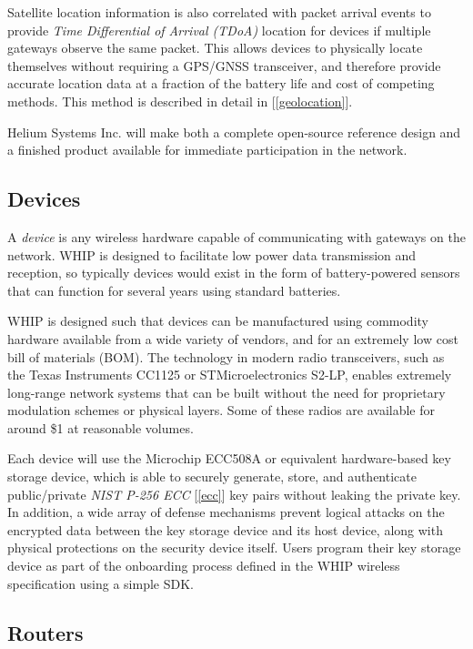 \documentclass[letterpaper,11pt]{article}
\begin{document}
Satellite location information is also correlated with packet arrival events to provide \emph{Time Differential of Arrival (TDoA)} location for devices if multiple gateways observe the same packet. This allows devices to physically locate themselves without requiring a GPS/GNSS transceiver, and therefore provide accurate location data at a fraction of the battery life and cost of competing methods. This method is described in detail in [\ref{geolocation}].\newline

Helium Systems Inc. will make both a complete open-source reference design and a finished product available for immediate participation in the network.

\subsection{Devices} \label{devices}

A \emph{device} is any wireless hardware capable of communicating with gateways on the network. WHIP is designed to facilitate low power data transmission and reception, so typically devices would exist in the form of battery-powered sensors that can function for several years using standard batteries.\newline

WHIP is designed such that devices can be manufactured using commodity hardware available from a wide variety of vendors, and for an extremely low cost bill of materials (BOM). The technology in modern radio transceivers, such as the Texas Instruments CC1125 or STMicroelectronics S2-LP, enables extremely long-range network systems that can be built without the need for proprietary modulation schemes or physical layers. Some of these radios are available for around \$1 at reasonable volumes.\newline

Each device will use the Microchip ECC508A\cite{ecc} or equivalent hardware-based key storage device, which is able to securely generate, store, and authenticate public/private \emph{NIST P-256 ECC} [\ref{ecc}] key pairs without leaking the private key. In addition, a wide array of defense mechanisms prevent logical attacks on the encrypted data between the key storage device and its host device, along with physical protections on the security device itself. Users program their key storage device as part of the onboarding process defined in the WHIP wireless specification using a simple SDK.

\subsection{Routers}
\end{document}
